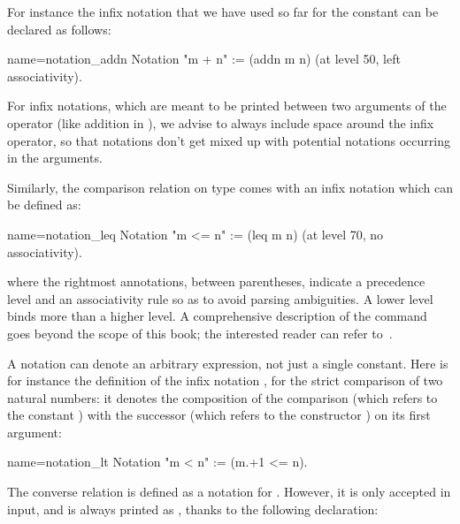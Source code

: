 For instance the infix notation that we have used so far for the
constant  can be declared as follows:

\begin{coq}{name=notation_addn}{}
Notation "m + n" := (addn m n) (at level 50, left associativity).
\end{coq}

For infix notations, which are meant to be printed between two arguments
of the operator (like addition in ), we advise to always include
space around the infix operator, so that notations don't get mixed up with
potential notations occurring in the arguments.


Similarly, the comparison relation  on type  comes with
an infix notation \C{<=} which can be defined as:

\begin{coq}{name=notation_leq}{}
Notation "m <= n" := (leq m n) (at level 70, no associativity).
\end{coq}

where the rightmost annotations, between parentheses, indicate a
precedence level and an associativity rule so as to avoid parsing
ambiguities. A lower level binds more than a higher level. A comprehensive
description of the  command goes beyond the scope of this
book; the interested reader can refer to~\cite[chapter 6.1, ``Syntax extensions and interpretation scopes'']{Coq:manual}.

A notation can denote an arbitrary expression, not just a
single constant. Here is for instance the definition of the infix
notation \C{<}, for the strict comparison of two natural numbers: it
denotes the composition of the comparison \C{_ <= _}
(which refers to the constant ) with the successor 
(which refers to the constructor ) on its first argument:

\begin{coq}{name=notation_lt}{}
Notation "m < n"  := (m.+1 <= n).
\end{coq}


The converse relation  is defined as a notation for
. However, it is only accepted in input,
and is always printed as  , thanks to the following declaration:

